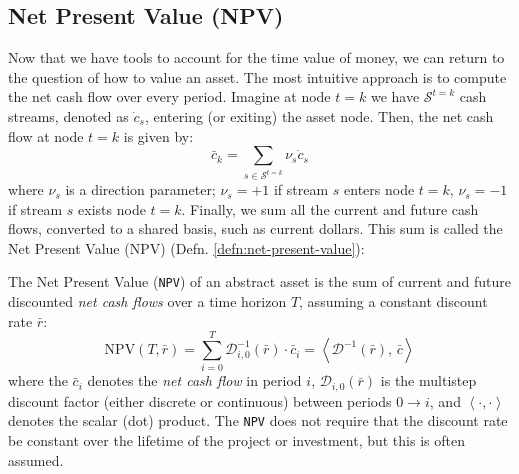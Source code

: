 \documentclass[11pt]{article}
\theoremstyle{definition}
\begin{document}
\subsection{Net Present Value (NPV)}
Now that we have tools to account for the time value of money, we can return to the question of how to value an asset. 
The most intuitive approach is to compute the net cash flow over every period. Imagine at node $t=k$ we have $\mathcal{S}^{t=k}$ cash streams,
denoted as $\dot{c}_{s}$, entering (or exiting) the asset node. 
Then, the net cash flow at node $t=k$ is given by:
\begin{equation}\label{eq:net-cash-flow}
\bar{c}_{k} = \sum_{s\in\mathcal{S}^{t=k}}\nu_{s}\dot{c}_{s}
\end{equation}
where $\nu_{s}$ is a direction parameter; $\nu_{s}=+1$ if stream $s$ enters node $t=k$, $\nu_{s}=-1$ if stream $s$ exists node $t=k$. 
Finally, we sum all the current and future cash flows, converted to a shared basis, such as current dollars. 
This sum is called the Net Present Value (NPV) (Defn. \ref{defn:net-present-value}): 
\begin{definition}\label{defn:net-present-value}
The Net Present Value (\texttt{NPV}) of an abstract asset is the sum of current and future discounted \textit{net cash flows} over a time horizon $T$, 
assuming a constant discount rate $\bar{r}$:
\begin{equation}    
\text{NPV}(T, \bar{r}) = \sum_{i=0}^{T}{\mathcal{D}_{i,0}^{-1}}(\bar{r})\cdot\bar{c}_{i} = \left<\mathcal{D}^{-1}(\bar{r}),\,\bar{c}\right>
\end{equation}
where the $\bar{c}_{i}$ denotes the \textit{net cash flow} in period $i$, 
$\mathcal{D}_{i,0}(\bar{r})$ is the multistep discount factor (either discrete or continuous) between periods $0\rightarrow{i}$, and
$\left<\cdot,\cdot\right>$ denotes the scalar (dot) product.
The \texttt{NPV} does not require that the discount rate be constant over the lifetime of the project or investment, 
but this is often assumed.

\end{definition}
\end{document}
